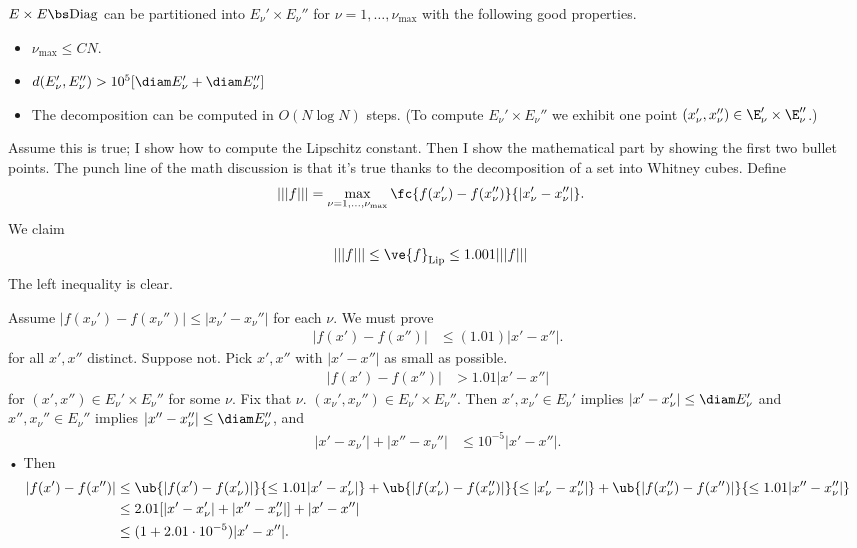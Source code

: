 $E\times E\bs \text{Diag}$ can be partitioned into  $E_\nu' \times E_\nu''$ for $\nu=1,\ldots, \nu_{\max}$ with the following good properties. 
\begin{itemize}
\item
$\nu_{\max} \le CN$. 
\item
$d(E_\nu', E_{\nu}'')>10^5 [\diam E_\nu' + \diam E_\nu'']$
\item
The decomposition can be computed in $O(N\log N)$ steps. %
(To compute $E_\nu' \times E_\nu''$ we exhibit one point $(x_\nu', x_\nu'')\in \E_\nu'\times \E_\nu''$.)
\end{itemize}
Assume this is true; I show how to compute the Lipschitz constant. Then I show the mathematical part by showing the first two bullet points. The punch line of the math discussion is that it's true thanks to the decomposition of a set into Whitney cubes. 
Define
\begin{align}
|||f||| &= \max_{\nu = 1,\ldots, \nu_{\max}}
\fc{f(x_{\nu}') - f(x_\nu'')}{|x_\nu'-x_\nu''|}. 
\end{align}
We claim
\begin{align}
|||f||| &\le \ve{f}_{\text{Lip}} \le 1.001|||f|||
\end{align}
The left inequality is clear. 

Assume $|f(x_\nu')- f(x_\nu'')|\le |x_\nu'- x_\nu''|$ for each $\nu$. 
We must prove
\begin{align}
|f(x')-f(x'')| &\le (1.01) |x'-x''|.
\end{align}
for all $x',x''$ distinct. 
Suppose not. Pick $x',x''$ with $|x'-x''|$ as small as possible.
\begin{align}
|f(x')-f(x'')|&> 1.01 |x'-x''|
\end{align}
for $(x',x'')\in E_\nu' \times E_\nu''$ for some $\nu$. Fix that $\nu$. 
$(x_\nu',x_\nu'')\in E_\nu'\times E_\nu''$.
Then $x',x_\nu'\in E_\nu'$ implies $|x'-x_\nu'|\le \diam E_\nu'$ and $x'',x_\nu''\in E_\nu''$ implies $|x''-x_\nu''|\le \diam E_\nu''$, and
\begin{align}
|x'-x_\nu'|+ |x''-x_\nu''| &\le 10^{-5} |x'-x''|.
\end{align}•
Then
\begin{align}
|f(x')-f(x'')| &\le 
\ub{|f(x') - f(x_\nu')| }{\le 1.01 |x'-x_\nu'|}
+ \ub{|f(x_\nu') - f(x_\nu'')|}{\le |x_\nu'-x_\nu''|}
+ \ub{|f(x''_\nu) - f(x'')|}{\le 1.01|x''-x_\nu''|}\\
&\le 2.01 [|x'-x_\nu'| + |x''-x_\nu''|] +|x'-x''| \\
&\le (1+ 2.01 \cdot 10^{-5} )|x'-x''| .
\end{align}